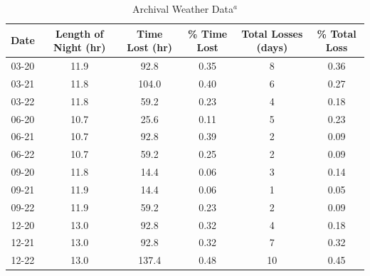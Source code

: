 \begin{table}[t]
  \centering
  \caption{Archival Weather Data$^a$}
  \label{totalLossTable}
  \begin{tabular}{cccccc}
    \hline
Date & Length of Night (hr) & Time Lost (hr) & \% Time Lost & Total Losses (days) & \% Total Loss \\
    \hline
    \hline
03-20&11.9&92.8&0.35&8&0.36\\
03-21&11.8&104.0&0.40&6&0.27\\
03-22&11.8&59.2&0.23&4&0.18\\
06-20&10.7&25.6&0.11&5&0.23\\
06-21&10.7&92.8&0.39&2&0.09\\
06-22&10.7&59.2&0.25&2&0.09\\
09-20&11.8&14.4&0.06&3&0.14\\
09-21&11.9&14.4&0.06&1&0.05\\
09-22&11.9&59.2&0.23&2&0.09\\
12-20&13.0&92.8&0.32&4&0.18\\
12-21&13.0&92.8&0.32&7&0.32\\
12-22&13.0&137.4&0.48&10&0.45\\
\hline
\hline
\end{tabular}
\end{table}


